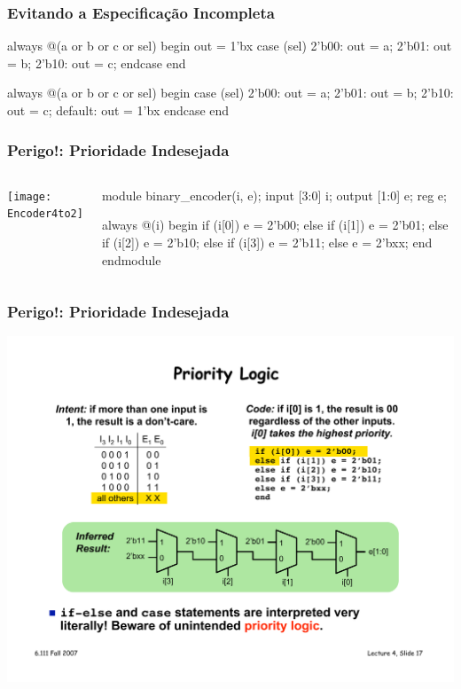 \begin{frame}[fragile]
	\frametitle{Evitando a Especificação Incompleta}
 \begin{multicols}{2}
	\begin{verilogcode}
  always @(a or b or c or sel)
  begin
    out = 1'bx
    case (sel)
      2'b00: out = a;
      2'b01: out = b;
      2'b10: out = c;
    endcase
  end
    \end{verilogcode}
	\begin{verilogcode}
  always @(a or b or c or sel)
  begin
    case (sel)
      2'b00: out = a;
      2'b01: out = b;
      2'b10: out = c;
      default: out = 1'bx
    endcase
  end
    \end{verilogcode}
    \end{multicols}
\end{frame}

\begin{frame}[fragile]
	\frametitle{Perigo!: Prioridade Indesejada}
	\begin{columns}
        \texttt{[image: Encoder4to2]}
    	\begin{verilogcode}
module binary_encoder(i, e); 
  input [3:0] i;
  output [1:0] e;
  reg e;
 
  always @(i)
  begin
    if (i[0]) 
      e = 2'b00; 
    else if (i[1]) 
      e = 2'b01; 
    else if (i[2]) 
      e = 2'b10; 
    else if (i[3]) 
      e = 2'b11; 
    else 
      e = 2'bxx;
  end
endmodule
        \end{verilogcode}
    \end{columns}
\end{frame}

\begin{frame}[fragile]
	\frametitle{Perigo!: Prioridade Indesejada}
    \includegraphics[scale=.5]{figs/Encoder4to2Pri}
\end{frame}

